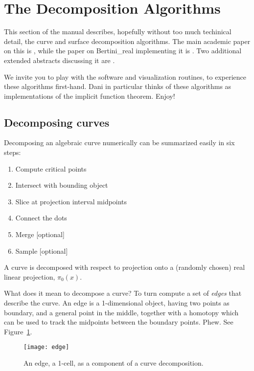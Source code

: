 \section{The Decomposition Algorithms}
\label{sec:algo}

This section of the manual describes, hopefully without too much techinical detail, the curve and surface decomposition algorithms.  The main academic paper on this is \cite{besana2013cell}, while the paper on Bertini\_real implementing it is \cite{BrN15}.  Two additional extended abstracts discussing it are \cite{Brake2014, On14}.

We invite you to play with the software and visualization routines, to experience these algorithms first-hand.  Dani in particular thinks of these algorithms as implementations of the implicit function theorem.  Enjoy!


\subsection{Decomposing curves}
\label{sec:algo_curve}



Decomposing an algebraic curve numerically can be summarized easily in six steps:
%
\begin{enumerate}[noitemsep]
\item Compute critical points
\item Intersect with bounding object
\item Slice at projection interval midpoints
\item Connect the dots
\item Merge [optional]
\item Sample [optional]
\end{enumerate}

A curve is decomposed with respect to projection onto a (randomly chosen) real linear projection, $\pi_0(x)$.


What does it mean to decompose a curve?  To turn compute a set of {\em edges} that describe the curve.  An edge is a 1-dimensional object, having two points as boundary, and a general point in the middle, together with a homotopy which can be used to track the midpoints between the boundary points.  Phew.  See Figure~\ref{fig:edge}.




\begin{figure}[H]
\begin{center}
\texttt{[image: edge]}
\caption{An edge, a 1-cell, as a component of a curve decomposition.}
\label{fig:edge}
\end{center}
\end{figure}


